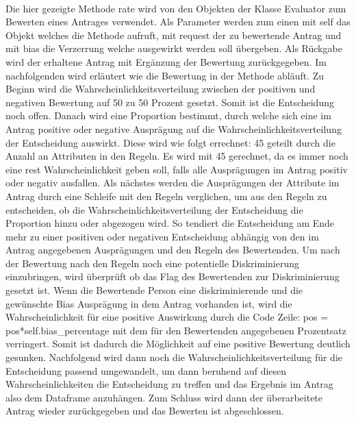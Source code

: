 \begin{onehalfspace}
\begin{figure}[h]
\end{figure}\\
Die hier gezeigte Methode \glqq{}rate\grqq{} wird von den Objekten der Klasse \glqq{}Evaluator\grqq{} zum Bewerten eines Antrages verwendet. Als Parameter werden zum einen mit \glqq{}self\grqq{} das Objekt welches die Methode aufruft, mit \glqq{}request\grqq{} der zu bewertende Antrag und mit \glqq{}bias\grqq{} die Verzerrung welche ausgewirkt werden soll übergeben. Als Rückgabe wird der erhaltene Antrag mit Ergänzung der Bewertung zurückgegeben. Im nachfolgenden wird erläutert wie die Bewertung in der Methode abläuft.
Zu Beginn wird die Wahrscheinlichkeitsverteilung zwischen der positiven und negativen Bewertung auf 50 zu 50 Prozent gesetzt. Somit ist die Entscheidung noch offen. Danach wird eine Proportion bestimmt, durch welche sich eine im Antrag positive oder negative Ausprägung auf die Wahrscheinlichkeitsverteilung der Entscheidung auswirkt. Diese wird wie folgt errechnet: 45 geteilt durch die Anzahl an Attributen in den Regeln. Es wird mit 45 gerechnet, da es immer noch eine rest Wahrscheinlichkeit geben soll, falls alle Ausprägungen im Antrag positiv oder negativ ausfallen. Als nächstes werden die Ausprägungen der Attribute im Antrag durch eine Schleife mit den Regeln verglichen, um aus den Regeln zu entscheiden, ob die Wahrscheinlichkeitsverteilung der Entscheidung die Proportion hinzu oder abgezogen wird. So tendiert die Entscheidung am Ende mehr zu einer positiven oder negativen Entscheidung abhängig von den im Antrag angegebenen Ausprägungen und den Regeln des Bewertenden. Um nach der Bewertung nach den Regeln noch eine potentielle Diskriminierung einzubringen, wird überprüft ob das Flag des Bewertenden zur Diskriminierung gesetzt ist. Wenn die Bewertende Person eine diskriminierende und die gewünschte Bias Ausprägung in dem Antrag vorhanden ist, wird die Wahrscheinlichkeit für eine positive Auswirkung durch die Code Zeile: \glqq{}pos = pos*self.bias\_percentage\grqq{} mit dem für den Bewertenden angegebenen Prozentsatz verringert. Somit ist dadurch die Möglichkeit auf eine positive Bewertung deutlich gesunken. Nachfolgend wird dann noch die Wahrscheinlichkeitsverteilung für die Entscheidung passend umgewandelt, um dann beruhend auf diesen Wahrscheinlichkeiten die Entscheidung zu treffen und das Ergebnis im Antrag also dem Dataframe anzuhängen. Zum Schluss wird dann der überarbeitete Antrag wieder zurückgegeben und das Bewerten ist abgeschlossen.

\end{onehalfspace}
